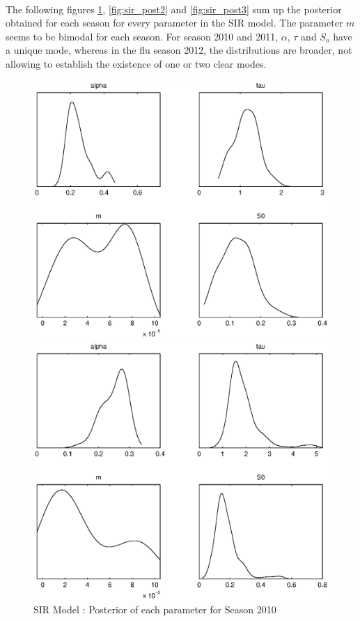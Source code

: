 \documentclass[11pt, a4paper]{article}
\begin{document}
\paragraph{}
The following figures \ref{fig:sir_post1}, \ref{fig:sir_post2} and \ref{fig:sir_post3} sum up the posterior obtained for each season for every parameter in the SIR model. The parameter $m$ seems to be bimodal for each season. For season 2010 and 2011, $\alpha$, $\tau$ and $S_o$ have a unique mode, whereas in the flu season 2012, the distributions are broader, not allowing to establish the existence of one or two clear modes.

\begin{figure}[H!]
\FloatBarrier
\centering
    \includegraphics[height = 0.25\textheight]{figures/SIR_posterior_season1.eps}
    \caption{SIR Model : Posterior of each parameter for Season 2010}
    \label{fig:sir_post1}
    \includegraphics[height = 0.25\textheight]{figures/SIR_posterior_season2.eps}

\end{figure}
\end{document}
